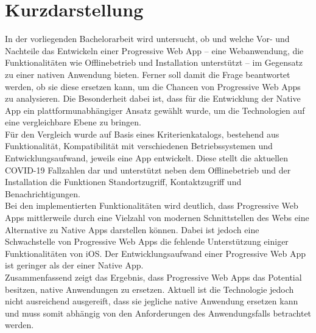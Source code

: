 \thispagestyle{empty}
\section*{Kurzdarstellung}
\label{sec:kurzdarstellung}
In der vorliegenden Bachelorarbeit wird untersucht, ob und welche Vor- und Nachteile das Entwickeln einer Progressive Web App -- eine Webanwendung, die Funktionalitäten wie Offlinebetrieb und Installation unterstützt -- im Gegensatz zu einer nativen Anwendung bieten. 
Ferner soll damit die Frage beantwortet werden, ob sie diese ersetzen kann, um die Chancen von Progressive Web Apps zu analysieren.
Die Besonderheit dabei ist, dass für die Entwicklung der Native App ein plattformunabhängiger Ansatz gewählt wurde, um die Technologien auf eine vergleichbare Ebene zu bringen.\\
Für den Vergleich wurde auf Basis eines Kriterienkatalogs, bestehend aus Funktionalität, Kompatibilität mit verschiedenen Betriebssystemen und Entwicklungsaufwand, jeweils eine App entwickelt.
Diese stellt die aktuellen COVID-19 Fallzahlen dar und unterstützt neben dem Offlinebetrieb und der Installation die Funktionen Standortzugriff, Kontaktzugriff und Benachrichtigungen.\\
Bei den implementierten Funktionalitäten wird deutlich, dass Progressive Web Apps mittlerweile durch eine Vielzahl von modernen Schnittstellen des Webs eine Alternative zu Native Apps darstellen können.
Dabei ist jedoch eine Schwachstelle von Progressive Web Apps die fehlende Unterstützung einiger Funktionalitäten von iOS.
Der Entwicklungsaufwand einer Progressive Web App ist geringer als der einer Native App.\\
Zusammenfassend zeigt das Ergebnis, dass Progressive Web Apps das Potential besitzen, native Anwendungen zu ersetzen.
Aktuell ist die Technologie jedoch nicht ausreichend ausgereift, dass sie jegliche native Anwendung ersetzen kann und muss somit abhängig von den Anforderungen des Anwendungsfalls betrachtet werden.